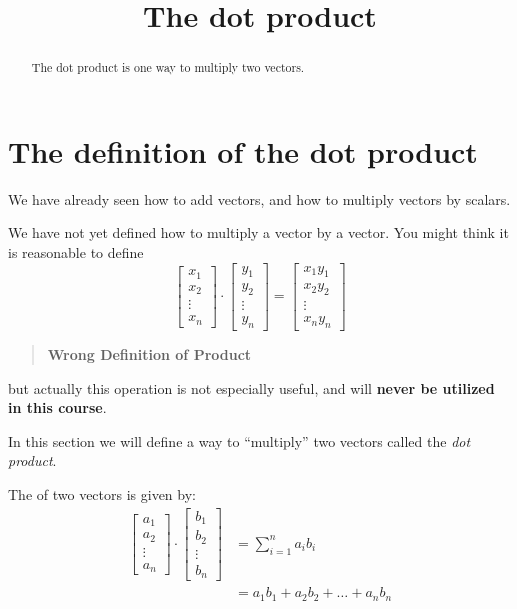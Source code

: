 \documentclass{ximera}
\title[Dig-In:]{The dot product}
\begin{document}
\begin{abstract}
  The dot product is one way to multiply two vectors.
\end{abstract}
\maketitle


\section{The definition of the dot product}

We have already seen how to add vectors, and how to multiply vectors
by scalars.

\begin{warning}
We have not yet defined how to multiply a vector by a vector.  You
might think it is reasonable to define
\[
\begin{bmatrix}x_1\\x_2\\\vdots\\x_n\end{bmatrix} \cdot  \begin{bmatrix}y_1\\y_2\\\vdots\\y_n\end{bmatrix}=\begin{bmatrix}x_1y_1\\x_2y_2\\\vdots\\x_ny_n\end{bmatrix}
\] 
\begin{quote}
  \textbf{Wrong Definition of Product}
\end{quote}
but actually this operation is not especially useful, and will
\textbf{never be utilized in this course}.
\end{warning}

In this section we will define a way to ``multiply'' two vectors
called the \textit{dot product}.

\begin{definition}
  The  of two vectors is given by:
  \begin{align*}
  \begin{bmatrix}
    a_1\\
    a_2\\
    \vdots\\
    a_n
  \end{bmatrix}
  \cdot
  \begin{bmatrix}
    b_1\\
    b_2\\
    \vdots\\
    b_n
  \end{bmatrix}
  &= \sum_{i=1}^n a_ib_i\\
  &= a_1b_1 + a_2b_2 +\dots+a_nb_n
  \end{align*}
\end{definition}
\end{document}
